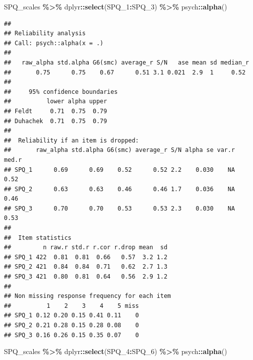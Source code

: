 \documentclass[
]{article}
\newenvironment{Shaded}{\begin{snugshade}}{\end{snugshade}}
\newcommand{\FunctionTok}[1]{\textcolor[rgb]{0.13,0.29,0.53}{\textbf{#1}}}
\newcommand{\NormalTok}[1]{#1}
\newcommand{\SpecialCharTok}[1]{\textcolor[rgb]{0.81,0.36,0.00}{\textbf{#1}}}
\begin{document}
\begin{Shaded}
\begin{Highlighting}[]
\NormalTok{SPQ\_scales }\SpecialCharTok{\%\textgreater{}\%}\NormalTok{ dplyr}\SpecialCharTok{::}\FunctionTok{select}\NormalTok{(SPQ\_1}\SpecialCharTok{:}\NormalTok{SPQ\_3) }\SpecialCharTok{\%\textgreater{}\%}\NormalTok{ psych}\SpecialCharTok{::}\FunctionTok{alpha}\NormalTok{()}
\end{Highlighting}
\end{Shaded}

\begin{verbatim}
## 
## Reliability analysis   
## Call: psych::alpha(x = .)
## 
##   raw_alpha std.alpha G6(smc) average_r S/N   ase mean sd median_r
##       0.75      0.75    0.67      0.51 3.1 0.021  2.9  1     0.52
## 
##     95% confidence boundaries 
##          lower alpha upper
## Feldt     0.71  0.75  0.79
## Duhachek  0.71  0.75  0.79
## 
##  Reliability if an item is dropped:
##       raw_alpha std.alpha G6(smc) average_r S/N alpha se var.r med.r
## SPQ_1      0.69      0.69    0.52      0.52 2.2    0.030    NA  0.52
## SPQ_2      0.63      0.63    0.46      0.46 1.7    0.036    NA  0.46
## SPQ_3      0.70      0.70    0.53      0.53 2.3    0.030    NA  0.53
## 
##  Item statistics 
##         n raw.r std.r r.cor r.drop mean  sd
## SPQ_1 422  0.81  0.81  0.66   0.57  3.2 1.2
## SPQ_2 421  0.84  0.84  0.71   0.62  2.7 1.3
## SPQ_3 421  0.80  0.81  0.64   0.56  2.9 1.2
## 
## Non missing response frequency for each item
##          1    2    3    4    5 miss
## SPQ_1 0.12 0.20 0.15 0.41 0.11    0
## SPQ_2 0.21 0.28 0.15 0.28 0.08    0
## SPQ_3 0.16 0.26 0.15 0.35 0.07    0
\end{verbatim}

\begin{Shaded}
\begin{Highlighting}[]
\NormalTok{SPQ\_scales }\SpecialCharTok{\%\textgreater{}\%}\NormalTok{ dplyr}\SpecialCharTok{::}\FunctionTok{select}\NormalTok{(SPQ\_4}\SpecialCharTok{:}\NormalTok{SPQ\_6) }\SpecialCharTok{\%\textgreater{}\%}\NormalTok{ psych}\SpecialCharTok{::}\FunctionTok{alpha}\NormalTok{()}
\end{Highlighting}
\end{Shaded}
\end{document}
